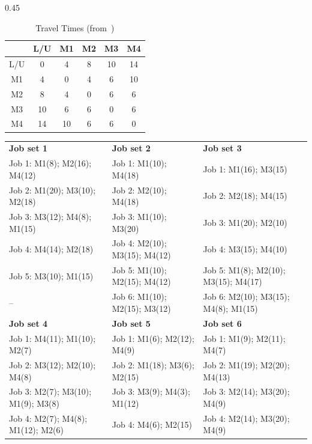 \documentclass[preprint, 3p, review, 12pt]{elsarticle}
\begin{document}
\begin{table}[h!]
\begin{subtable}[c]{0.45\textwidth}
\begin{tabular}{c| c c c c c}
        & L/U & M1 & M2 & M3 & M4\\
    \hline
        L/U & 0 & 4 & 8 & 10 & 14\\
        M1 & 4 & 0 & 4 & 6 & 10\\
        M2 & 8 & 4 & 0 & 6 & 6\\
        M3 & 10 & 6 & 6 & 0 & 6\\
        M4 & 14 & 10 & 6 & 6 & 0\\
    \hline
    \end{tabular}
     \label{tab:l4_tra_times}
    \caption{Layout 4}
\end{subtable}
\caption{Travel Times (from~\cite{SANOGO2025103060})}
\label{tab:travel_times}
\end{table}

\begin{table}[h!]
\centering
\scriptsize %
\setlength{\tabcolsep}{4pt} %
\renewcommand{\arraystretch}{1.1} %
\begin{tabular}{@{}p{} p{} p{}@{}}
\toprule
\textbf{Job set 1} & \textbf{Job set 2} & \textbf{Job set 3} \\
Job 1: M1(8); M2(16); M4(12) & Job 1: M1(10); M4(18) & Job 1: M1(16); M3(15) \\
Job 2: M1(20); M3(10); M2(18) & Job 2: M2(10); M4(18) & Job 2: M2(18); M4(15) \\
Job 3: M3(12); M4(8); M1(15) & Job 3: M1(10); M3(20) & Job 3: M1(20); M2(10) \\
Job 4: M4(14); M2(18) & Job 4: M2(10); M3(15); M4(12) & Job 4: M3(15); M4(10) \\
Job 5: M3(10); M1(15) & Job 5: M1(10); M2(15); M4(12) & Job 5: M1(8); M2(10); M3(15); M4(17) \\
-- & Job 6: M1(10); M2(15); M3(12) & Job 6: M2(10); M3(15); M4(8); M1(15) \\
\midrule
\textbf{Job set 4} & \textbf{Job set 5} & \textbf{Job set 6} \\
Job 1: M4(11); M1(10); M2(7) & Job 1: M1(6); M2(12); M4(9) & Job 1: M1(9); M2(11); M4(7) \\
Job 2: M3(12); M2(10); M4(8) & Job 2: M1(18); M3(6); M2(15) & Job 2: M1(19); M2(20); M4(13) \\
Job 3: M2(7); M3(10); M1(9); M3(8) & Job 3: M3(9); M4(3); M1(12) & Job 3: M2(14); M3(20); M4(9) \\
Job 4: M2(7); M4(8); M1(12); M2(6) & Job 4: M4(6); M2(15) & Job 4: M2(14); M3(20); M4(9) \\

\end{tabular}
\end{table}
\end{document}
